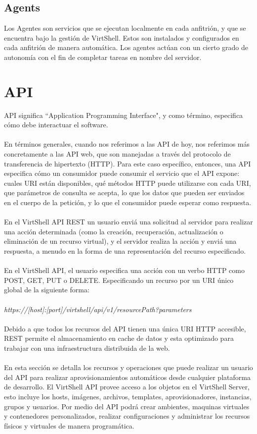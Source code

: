 \documentclass[conference, spanish]{IEEEtran}
\begin{document}
\subsection{Agents}
Los Agentes son servicios que se ejecutan localmente en cada anfitrión, y que se encuentra bajo la gestión de VirtShell. Estos son instalados y configurados en cada anfitrión de manera automática. Los agentes actúan con un cierto grado de autonomía con el fin de completar tareas en nombre del servidor.\\

\section{API}
API significa ``Application Programming Interface", y como término, especifica cómo debe interactuar el software.\\
\\
En términos generales, cuando nos referimos a las API de hoy, nos referimos más concretamente a las API web, que son manejadas a través del protocolo de transferencia de hipertexto (HTTP). Para este caso específico, entonces, una API especifica cómo un consumidor puede consumir el servicio que el API expone: cuales URI están disponibles, qué métodos HTTP puede utilizarse con cada URI, que parámetros de consulta se acepta, lo que los datos que pueden ser enviados en el cuerpo de la petición, y lo que el consumidor puede esperar como respuesta.\\
\\
En el VirtShell API REST un usuario enviá una solicitud al servidor para realizar una acción determinada (como la creación, recuperación, actualización o eliminación de un recurso virtual), y el servidor realiza la acción y enviá una respuesta, a menudo en la forma de una representación del recurso especificado.\\
\\
En el VirtShell API, el usuario especifica una acción con un verbo HTTP como POST, GET, PUT o DELETE. Especificando un recurso por un URI único global de la siguiente forma: \\
\\
\emph{https://[host]:[port]/virtshell/api/v1/resourcePath?parameters}\\
\\
Debido a que todos los recursos del API tienen una única URI HTTP accesible, REST permite el almacenamiento en cache de datos y esta optimizado para trabajar con una infraestructura distribuida de la web.\\
\\
En esta sección se detalla los recursos y operaciones que puede realizar un usuario del API para realizar aprovisionamientos automáticos desde cualquier plataforma de desarrollo. El VirtShell API provee acceso a los objetos en el VirtShell Server, esto incluye los hosts, imágenes, archivos, templates, aprovisionadores, instancias, grupos y usuarios. Por medio del API podrá crear ambientes, maquinas virtuales y contenedores personalizados, realizar configuraciones y administrar los recursos físicos y virtuales de manera programática. \\
\end{document}
